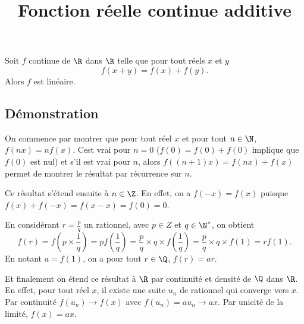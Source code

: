 \documentclass[fontsize=12pt,twoside=false,parskip=half,french]{scrartcl}
\title{Fonction réelle continue additive}
\date{}
\author{}
\begin{document}
\maketitle
   \begin{Theoreme}
      Soit $f$ continue de $\R$ dans $\R$ telle que pour tout réels $x$ et $y$
      \[
        f(x + y) = f(x) + f(y). 
      \]
      Alors $f$ est linéaire. 
   \end{Theoreme}
   \subsection{Démonstration}
        On commence par montrer que pour tout réel $x$ et pour tout $n \in \N$,
        $f(nx) = nf(x)$. Cest vrai pour $n = 0$ ($f(0) = f(0) + f(0)$
        implique que $f(0)$ est nul) et s'il est vrai pour $n$, alors 
        $f((n + 1)x) = f(nx) + f(x)$ permet de montrer le résultat par récurrence
        sur $n$.
        
        Ce résultat s'étend ensuite à $ n \in \Z$. En effet, on a $f(-x) = f(x)$
        puisque $f(x) + f(-x) =f(x - x) = f(0) = 0$.
        
        En considérant $r = \frac{p}{q}$ un rationnel, avec $p \in Z$ et $q \in \N^*$,
        on obtient
        \[
            f(r) = f\left(p \times \frac{1}{q}\right) = p f\left(\frac{1}{q}\right)
                 = \frac{p}{q}\times q \times f\left(\frac{1}{q}\right) 
                 = \frac{p}{q}\times q \times f(1)
                 = rf(1). 
        \]
        En notant $a = f(1)$, on a pour tout $r \in \Q$, $f(r) = ar$.

        Et finalement on étend ce résultat à $\R$ par continuité et densité de $\Q$
        dans $\R$. En effet, pour tout réel $x$, il existe une suite $u_n$ de 
        rationnel qui converge vers $x$. Par continuité $f(u_n) \to f(x)$ avec
        $f(u_n) = au_n \to ax$. Par unicité de la limité, $f(x) = ax$.
        
\end{document}
